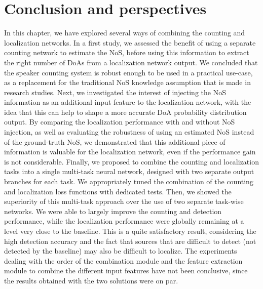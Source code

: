 \section{Conclusion and perspectives}

In this chapter, we have explored several ways of combining the counting and localization networks. In a first study, we assessed the benefit of using a separate counting network to estimate the NoS, before using this information to extract the right number of DoAs from a localization network output. We concluded that the speaker counting system is robust enough to be used in a practical use-case, as a replacement for the traditional NoS knowledge assumption that is made in research studies. Next, we investigated the interest of injecting the NoS information as an additional input feature to the localization network, with the idea that this can help to shape a more accurate DoA probability distribution output. By comparing the localization performance with and without NoS injection, as well as evaluating the robustness of using an estimated NoS instead of the ground-truth NoS, we demonstrated that this additional piece of information is valuable for the localization network, even if the performance gain is not considerable. Finally, we proposed to combine the counting and localization tasks into a single multi-task neural network, designed with two separate output branches for each task. We appropriately tuned the combination of the counting and localization loss functions with dedicated tests. Then, we showed the superiority of this multi-task approach over the use of two separate task-wise networks. We were able to largely improve the counting and detection performance, while the localization performance were globally remaining at a level very close to the baseline. This is a quite satisfactory result, considering the high detection accuracy and the fact that sources that are difficult to detect (not detected by the baseline) may also be difficult to localize. The experiments dealing with the order of the combination module and the feature extraction module to combine the different input features have not been conclusive, since the results obtained with the two solutions were on par.

